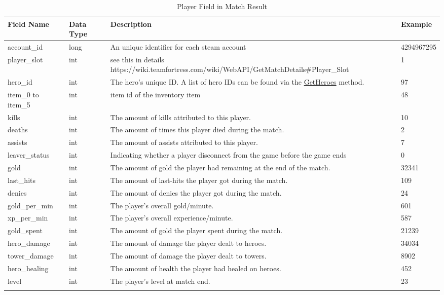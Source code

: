 \documentclass{article}
\begin{document}
\begin{longtable}{|p{2.5cm}|p{2cm}|p{5.5cm}|p{3cm}|}

\hline
\textbf{Field Name} & \textbf{Data Type} & \textbf{Description}  & \textbf{Example} \\
\hline
\endhead

account\_id & long & An unique identifier for each steam account & 4294967295 \\
\hline
player\_slot & int & see this in details https://wiki.teamfortress.com/wiki/WebAPI/GetMatchDetails\#Player\_Slot & 1 \\
\hline
hero\_id & int & The hero's unique ID. A list of hero IDs can be found via the \href{https://wiki.teamfortress.com/wiki/WebAPI/GetHeroes}{GetHeroes} method. & 97 \\
\hline
item\_0 to item\_5 & int & item id of the inventory item & 48 \\
\hline
kills & int & The amount of kills attributed to this player. & 10 \\
\hline
deaths & int & The amount of times this player died during the match. & 2 \\
\hline
assists & int & The amount of assists attributed to this player. & 7 \\
\hline
leaver\_status & int & Indicating whether a player disconnect from the game before the game ends & 0 \\
\hline
gold & int & The amount of gold the player had remaining at the end of the match. & 32341 \\
\hline
last\_hits & int & The amount of last-hits the player got during the match. & 109 \\
\hline
denies & int & The amount of denies the player got during the match. & 24 \\
\hline
gold\_per\_min & int &  The player's overall gold/minute. & 601 \\
\hline
xp\_per\_min & int & The player's overall experience/minute. & 587 \\
\hline
gold\_spent & int & The amount of gold the player spent during the match. & 21239 \\
\hline
hero\_damage & int & The amount of damage the player dealt to heroes. & 34034 \\
\hline
tower\_damage & int & The amount of damage the player dealt to towers. & 8902 \\
\hline
hero\_healing & int & The amount of health the player had healed on heroes. & 452 \\
\hline
level & int & The player's level at match end. & 23 \\
\hline
\caption{Player Field in Match Result}
\label{player-field-in-match-result}
\end{longtable}
\end{document}
